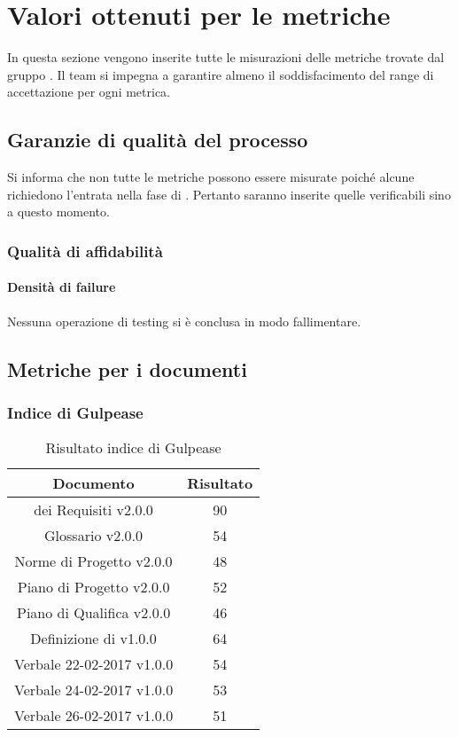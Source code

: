 \section{Valori ottenuti per le metriche}

In questa sezione vengono inserite tutte le misurazioni delle metriche trovate dal gruppo \gruppo.
Il team si impegna a garantire almeno il soddisfacimento del range di accettazione per ogni metrica.


\subsection{Garanzie di qualità del processo}
Si informa che non tutte le metriche possono essere misurate poiché alcune richiedono l'entrata nella fase di \COD. Pertanto saranno inserite quelle verificabili sino a questo momento.

\subsubsection{Qualità di affidabilità}

\paragraph{Densità di failure}

Nessuna operazione di testing si è conclusa in modo fallimentare.

\subsection{Metriche per i documenti}

\subsubsection{Indice di Gulpease}

\begin{table}[h]
	\begin{center}
		\begin{tabular}{|c|c|}
			\hline
			\textbf{Documento}	& \textbf{Risultato} \\
			\hline
		 \termine{Analisi} dei Requisiti v2.0.0 &	90\\
			\hline
			Glossario v2.0.0 &	54\\
			\hline
			Norme di Progetto v2.0.0 &	48\\
			\hline
			Piano di Progetto v2.0.0	&	52\\
			\hline
			Piano di Qualifica v2.0.0	&	46\\
			\hline
			Definizione di \termine{Prodotto} v1.0.0	&	64\\
			\hline
			Verbale 22-02-2017 v1.0.0	&	54\\
			\hline
			Verbale 24-02-2017 v1.0.0	&	53\\
			\hline
			Verbale 26-02-2017 v1.0.0	&	51\\
			\hline
		\end{tabular}
	\end{center}
	\caption{Risultato indice di Gulpease}
\end{table}

